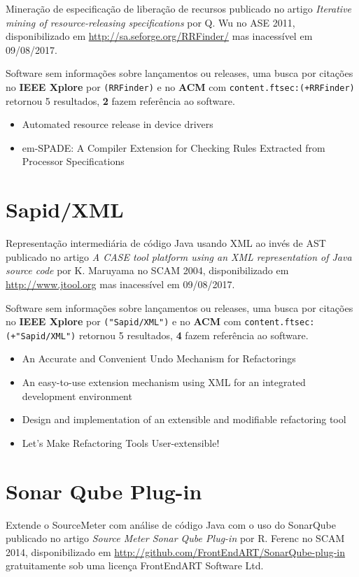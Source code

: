 Mineração de especificação de liberação de recursos
publicado no artigo {\it Iterative mining of resource-releasing specifications}
por Q. Wu
no ASE 2011,
disponibilizado em \url{http://sa.seforge.org/RRFinder/}
mas inacessível em 09/08/2017.

Software sem informações sobre lançamentos ou releases,
uma busca por citações no {\bf IEEE Xplore} por
\texttt{(RRFinder)}
e no {\bf ACM} com
\texttt{content.ftsec:(+RRFinder)}
retornou
5 resultados,
{\bf 2} fazem referência ao software.

\begin{itemize}
\item Automated resource release in device drivers
\item em-SPADE: A Compiler Extension for Checking Rules Extracted from Processor Specifications
\end{itemize}


\section{Sapid/XML}

Representação intermediária de código Java usando XML ao invés de AST
publicado no artigo {\it A CASE tool platform using an XML representation of Java source code}
por K. Maruyama
no SCAM 2004,
disponibilizado em \url{http://www.jtool.org}
mas inacessível em 09/08/2017.

Software sem informações sobre lançamentos ou releases,
uma busca por citações no {\bf IEEE Xplore} por
\texttt{("Sapid/XML")}
e no {\bf ACM} com
\texttt{content.ftsec:(+"Sapid/XML")}
retornou
5 resultados,
{\bf 4} fazem referência ao software.

\begin{itemize}
\item An Accurate and Convenient Undo Mechanism for Refactorings
\item An easy-to-use extension mechanism using XML for an integrated development environment
\item Design and implementation of an extensible and modifiable refactoring tool
\item Let's Make Refactoring Tools User-extensible!
\end{itemize}


\section{Sonar Qube Plug-in}

Extende o SourceMeter com análise de código Java com o uso do SonarQube
publicado no artigo {\it Source Meter Sonar Qube Plug-in}
por R. Ferenc
no SCAM 2014,
disponibilizado em \url{http://github.com/FrontEndART/SonarQube-plug-in}
gratuitamente
sob uma licença FrontEndART Software Ltd.

